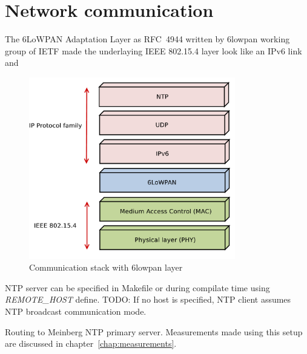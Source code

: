 
\section{Network communication}
The 6LoWPAN Adaptation Layer %
as RFC~4944 written by 6lowpan working group of IETF
made the underlaying IEEE 802.15.4 layer
look like an IPv6 link~\cite{6lowpan} and
\begin{figure}
  \centering
  \includegraphics[width=9cm,keepaspectratio]{fig/6lowpan.pdf}
  \caption{Communication stack with 6lowpan layer}
  \label{fig:implementation-6lowpan}
  \bigskip
\end{figure}

NTP server can be specified in Makefile or
during compilate time using {\it{REMOTE\_HOST}} define.
TODO: If no host is specified,
NTP client assumes NTP broadcast communication mode.





Routing to Meinberg NTP primary server.
Measurements made using this setup are discussed in chapter~\ref{chap:measurements}.
